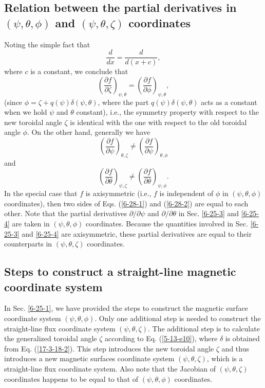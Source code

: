 \documentclass{article}
\begin{document}
\subsection{Relation between the partial derivatives in $(\psi, \theta, \phi)$
and $(\psi, \theta, \zeta)$ coordinates}

Noting the simple fact that
\begin{equation}
  \frac{d}{d x} = \frac{d}{d (x + c)},
\end{equation}
where $c$ is a constant, we conclude that
\begin{equation}
  \left( \frac{\partial f}{\partial \zeta} \right)_{\psi, \theta} = \left(
  \frac{\partial f}{\partial \phi} \right)_{\psi, \theta},
\end{equation}
(since $\phi = \zeta + q (\psi) \delta (\psi, \theta)$, where the part $q
(\psi) \delta (\psi, \theta)$ acts as a constant when we hold $\psi$ and
$\theta$ constant), i.e., the symmetry property with respect to the new
toroidal angle $\zeta$ is identical with the one with respect to the old
toroidal angle $\phi$. On the other hand, generally we have
\begin{equation}
  \label{6-28-1} \left( \frac{\partial f}{\partial \psi} \right)_{\theta,
  \zeta} \neq \left( \frac{\partial f}{\partial \psi} \right)_{\theta, \phi}
\end{equation}
and
\begin{equation}
  \label{6-28-2} \left( \frac{\partial f}{\partial \theta} \right)_{\psi,
  \zeta} \neq \left( \frac{\partial f}{\partial \theta} \right)_{\psi, \phi} .
\end{equation}
In the special case that $f$ is axisymmetric (i.e., $f$ is independent of
$\phi$ in $(\psi, \theta, \phi)$ coordinates), then two sides of Eqs.
(\ref{6-28-1}) and (\ref{6-28-2}) are equal to each other. Note that the
partial derivatives $\partial / \partial \psi$ and $\partial / \partial
\theta$ in Sec. \ref{6-25-3} and \ref{6-25-4} are taken in $(\psi, \theta,
\phi)$ coordinates. Because the quantities involved in Sec. \ref{6-25-3} and
\ref{6-25-4} are axisymmetric, these partial derivatives are equal to their
counterparts in $(\psi, \theta, \zeta)$ coordinates.

\subsection{Steps to construct a straight-line magnetic coordinate system}

In Sec. \ref{6-25-1}, we have provided the steps to construct the magnetic
surface coordinate system $(\psi, \theta, \phi)$. Only one additional step is
needed to construct the straight-line flux coordinate system $(\psi, \theta,
\zeta)$. The additional step is to calculate the generalized toroidal angle
$\zeta$ according to Eq. (\ref{5-13-e10}), where $\delta$ is obtained from Eq.
(\ref{17-3-18-2}). This step introduces the new toroidal angle $\zeta$ and
thus introduces a new magnetic surfaces coordinate system $(\psi, \theta,
\zeta)$, which is a straight-line flux coordinate system. Also note that the
Jacobian of $(\psi, \theta, \zeta)$ coordinates happens to be equal to that of
$(\psi, \theta, \phi)$ coordinates.
\end{document}
